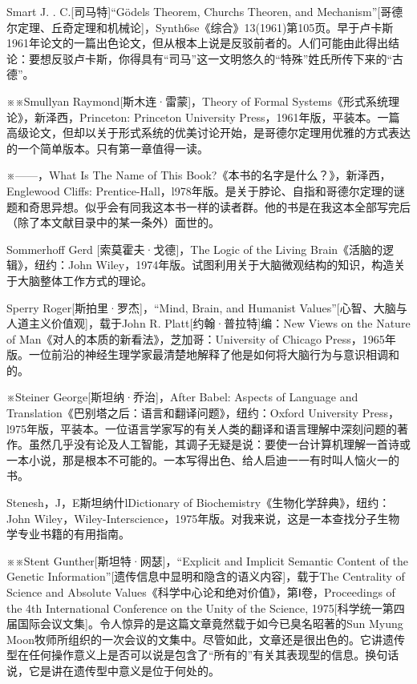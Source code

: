 \documentclass[
  12pt,
  twoside,
  openright,
  oldfontcommands,
]{memoir}
\begin{document}
Smart J. . C.{[}司马特{]}``Gödel\textquotesingle s Theorem, Church\textquotesingle s Theoren, and Mechanism''{[}哥德尔定理、丘奇定理和机械论{]}，Synth6se《综合》13(1961)第105页。早于卢卡斯1961年论文的一篇出色论文，但从根本上说是反驳前者的。人们可能由此得出结论：要想反驳卢卡斯，你得具有``司马''这一文明悠久的``特殊''姓氏所传下来的``古德''。

※※Smullyan Raymond{[}斯木连·雷蒙{]}，Theory of Formal Systems《形式系统理论》，新泽西，Princeton: Princeton University Press，1961年版，平装本。一篇高级论文，但却以关于形式系统的优美讨论开始，是哥德尔定理用优雅的方式表达的一个简单版本。只有第一章值得一读。

※------，What Is The Name of This Book?《本书的名字是什么？》，新泽西，Englewood Cliffs: Prentice-Hall，l978年版。是关于脖论、自指和哥德尔定理的谜题和奇思异想。似乎会有同我这本书一样的读者群。他的书是在我这本全部写完后（除了本文献目录中的某一条外）面世的。

Sommerhoff Gerd {[}索莫霍夫·戈德{]}，The Logic of the Living Brain《活脑的逻辑》，纽约：John Wiley，1974年版。试图利用关于大脑微观结构的知识，构造关于大脑整体工作方式的理论。

Sperry Roger{[}斯拍里·罗杰{]}，``Mind, Brain, and Humanist Values''{[}心智、大脑与人道主义价值观{]}，载于John R. Platt{[}约翰·普拉特{]}编：New Views on the Nature of Man《对人的本质的新看法》，芝加哥：University of Chicago Press，1965年版。一位前沿的神经生理学家最清楚地解释了他是如何将大脑行为与意识相调和的。

※Steiner George{[}斯坦纳·乔治{]}，After Babel: Aspects of Language and Translation《巴别塔之后：语言和翻译问题》，纽约：Oxford University Press，l975年版，平装本。一位语言学家写的有关人类的翻译和语言理解中深刻问题的著作。虽然几乎没有论及人工智能，其调子无疑是说：要使一台计算机理解一首诗或一本小说，那是根本不可能的。一本写得出色、给人启迪一一有时叫人恼火一的书。

Stenesh，J，E斯坦纳什lDictionary of Biochemistry《生物化学辞典》，纽约： John Wiley，Wiley-Interscience，1975年版。对我来说，这是一本查找分子生物学专业书籍的有用指南。

※※Stent Gunther{[}斯坦特·网瑟{]}，``Explicit and Implicit Semantic Content of the Genetic Information''{[}遗传信息中显明和隐含的语义内容{]}，载于The Centrality of Science and Absolute Values《科学中心论和绝对价值》，第Ⅰ卷，Proceedings of the 4th International Conference on the Unity of the Science, 1975{[}科学统一第四届国际会议文集{]}。令人惊异的是这篇文章竟然载于如今已臭名昭著的Sun Myung Moon牧师所组织的一次会议的文集中。尽管如此，文章还是很出色的。它讲遗传型在任何操作意义上是否可以说是包含了``所有的''有关其表现型的信息。换句话说，它是讲在遗传型中意义是位于何处的。
\end{document}
